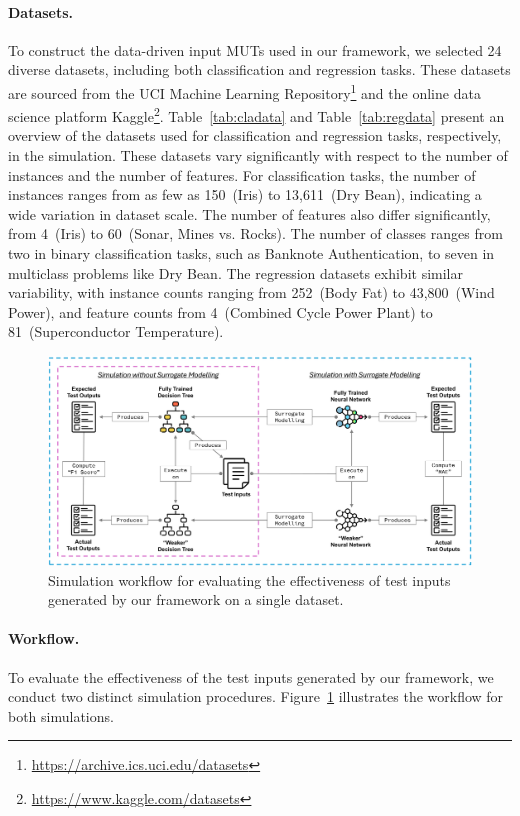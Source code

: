 \documentclass[
]{ceurart}
\theoremstyle{definition}
\begin{document}
\paragraph{Datasets.} To construct the data-driven input MUTs used in our framework, we selected 24 diverse datasets, including both classification and regression tasks. These datasets are sourced from the UCI Machine Learning Repository\footnote{\url{https://archive.ics.uci.edu/datasets}} and the online data science platform Kaggle\footnote{\url{https://www.kaggle.com/datasets}}. Table~\ref{tab:cladata} and Table~\ref{tab:regdata} present an overview of the datasets used for classification and regression tasks, respectively, in the simulation. These datasets vary significantly with respect to the number of instances and the number of features. For classification tasks, the number of instances ranges from as few as 150~(Iris) to 13,611~(Dry Bean), indicating a wide variation in dataset scale. The number of features also differ significantly, from 4~(Iris) to 60~(Sonar, Mines vs. Rocks). The number of classes ranges from two in binary classification tasks, such as Banknote Authentication, to seven in multiclass problems like Dry Bean. The regression datasets exhibit similar variability, with instance counts ranging from 252~(Body Fat) to 43,800~(Wind Power), and feature counts from 4~(Combined Cycle Power Plant) to 81~(Superconductor Temperature).

\begin{figure}
\centering
\includegraphics[width=\linewidth]{img/simulationsetup}
\caption{Simulation workflow for evaluating the effectiveness of test inputs generated by our framework on a single dataset.}
\label{fig:simflow}
\end{figure}

\paragraph{Workflow.} To evaluate the effectiveness of the test inputs generated by our framework, we conduct two distinct simulation procedures. Figure~\ref{fig:simflow} illustrates the workflow for both simulations.
\end{document}
